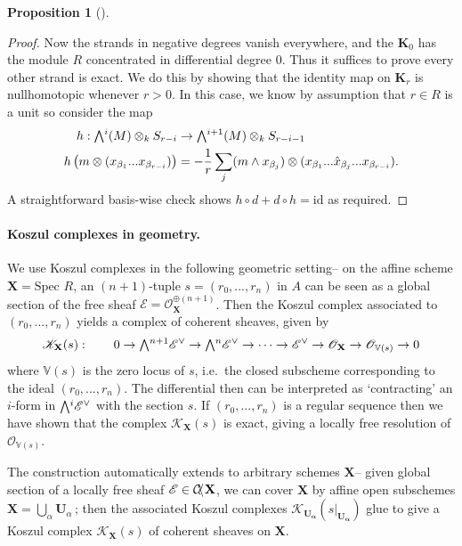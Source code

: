 \documentclass[a4paper]{article}
\theoremstyle{definition}
\newtheorem{prop}[defn]{Proposition}
\theoremstyle{remark}
\newcommand{\Exter}{\mathchoice{{\textstyle\bigwedge}}%
    {{\bigwedge}}%
    {{\textstyle\wedge}}%
    {{\scriptstyle\wedge}}}
\DeclareMathOperator{\coh}{\mathcal{C\kern -2pt o\kern -2pt h\kern -1pt}}
\begin{document}
\begin{prop}[]
\begin{proof}
        Now the strands in negative degrees vanish everywhere, and the
        \(\mathbf{K}_0\) has the module \(R\) concentrated in differential degree
        \(0\).  Thus it suffices to prove every other strand is exact. We do
        this by showing that the identity map on \(\mathbf{K}_r\) is
        nullhomotopic whenever \(r > 0\). In this case, we know by assumption
        that \(r\in R\) is a unit so consider the map
        \begin{align*} 
            h: \Exter^i(M) \otimes_k S_{r-i} &\rightarrow
            \Exter^{i+1}(M) \otimes_k S_{r-i-1} \\
            h\left(m\otimes (x_{\beta_1}...x_{\beta_{r-i}})\right)&= -\frac{1}{r}
            \sum_{j}(m \wedge x_{\beta_j}) \otimes (x_{\beta_1}...
            \hat{x}_{\beta_j}...x_{\beta_{r-i}}).  
        \end{align*}
        A straightforward basis-wise check shows \(h\circ d + d\circ h =
        \text{id}\) as required.
    \end{proof}
\end{prop}

\paragraph{Koszul complexes in geometry.} We use Koszul complexes in the
following geometric setting-- on the affine scheme \(\mathbf{X}=\text{Spec }R\),
an \((n+1)\)-tuple \(s=(r_0,...,r_n)\) in \(A\) can be seen as a global section of
the free sheaf \(\mathscr{E}=\mathscr{O}_\mathbf{X}^ {\oplus (n+1)}\). Then the
Koszul complex associated to \((r_0,...,r_n)\) yields a complex of coherent
sheaves, given by
\begin{gather*}
    \mathscr{K}_\mathbf{X}(s): \qquad 0\rightarrow \Exter^{n+1}\mathscr{E}^\vee
    \rightarrow \Exter^{n}\mathscr{E}^\vee \rightarrow\cdots \rightarrow
    \mathscr{E}^\vee \rightarrow \mathscr{O}_\mathbf{X}\rightarrow
    \mathscr{O}_{\mathbb{V}(s)}\rightarrow 0
\end{gather*}
where \(\mathbb{V}(s)\) is the zero locus of \(s\), i.e.\ the
closed subscheme corresponding to the ideal \((r_0,...,r_n)\). The differential
then can be interpreted as `contracting' an \(i\)-form in \(\Exter^i
\mathscr{E}^\vee\) with the section \(s\). If \((r_0,...,r_n)\) is a regular
sequence then we have shown that the complex \(\mathscr{K}_\mathbf{X}(s)\) is
exact, giving a locally free resolution of \(\mathscr{O}_{\mathbb{V}(s)}\).

The construction automatically extends to arbitrary schemes \(\mathbf{X}\)--
given global section of a locally free sheaf \(\mathscr{E}\in \coh\mathbf{X}\),
we can cover \(\mathbf{X}\) by affine open subschemes
\(\mathbf{X}=\bigcup_\alpha \mathbf{U}_\alpha\,\); then the associated Koszul
complexes \(\mathscr{K}_\mathbf{U_\alpha}(s|_\mathbf{U_\alpha})\) glue to give a
Koszul complex \(\mathscr{K}_\mathbf{X}(s)\) of coherent sheaves on
\(\mathbf{X}\). 
\end{document}
